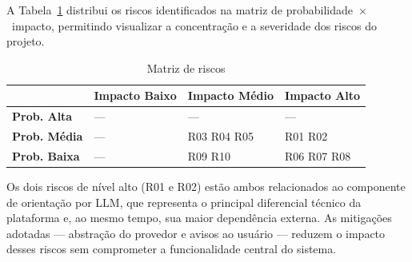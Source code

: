 A Tabela~\ref{tab:risk-matrix} distribui os riscos
identificados na matriz de probabilidade~$\times$~impacto,
permitindo visualizar a concentração e a severidade
dos riscos do projeto.

\begin{table}[H]
  \centering
  \caption{Matriz de riscos}
  \label{tab:risk-matrix}
  \begin{tabular}{>{\raggedright\arraybackslash}p{1.8cm}
                  >{\centering\arraybackslash}p{3.5cm}
                  >{\centering\arraybackslash}p{3.5cm}
                  >{\centering\arraybackslash}p{3.5cm}}
    \toprule
    &
    \textbf{Impacto Baixo} &
    \textbf{Impacto Médio} &
    \textbf{Impacto Alto} \\
    \midrule
    \textbf{Prob. Alta}
      & \cellcolor{warning!30} ---
      & \cellcolor{danger!35} ---
      & \cellcolor{danger!35} --- \\[18pt]
    \textbf{Prob. Média}
      & \cellcolor{success!25} ---
      & \cellcolor{warning!30} R03 \quad R04 \quad R05
      & \cellcolor{danger!35} R01 \quad R02 \\[18pt]
    \textbf{Prob. Baixa}
      & \cellcolor{success!25} ---
      & \cellcolor{success!25} R09 \quad R10
      & \cellcolor{warning!30} R06 \quad R07 \quad R08 \\[18pt]
    \bottomrule
  \end{tabular}
\end{table}

Os dois riscos de nível alto (R01 e R02) estão ambos
relacionados ao componente de orientação por LLM, que
representa o principal diferencial técnico da
plataforma e, ao mesmo tempo, sua maior dependência
externa. As mitigações adotadas — abstração do
provedor e avisos ao usuário — reduzem o impacto
desses riscos sem comprometer a funcionalidade
central do sistema.
